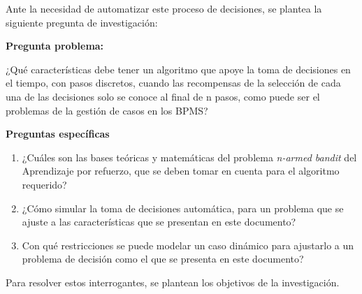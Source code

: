Ante la necesidad de automatizar este proceso de decisiones, se plantea la siguiente pregunta de investigación:

\textbf{Pregunta problema:}

¿Qué características debe tener un algoritmo que apoye la toma de decisiones en el tiempo, con pasos discretos, cuando las recompensas de la selección de cada una de las decisiones solo se conoce al final de n pasos, como puede ser el problemas de la gestión de casos en los BPMS?

\textbf{Preguntas específicas}

\begin{enumerate}

\item ¿Cuáles son las bases teóricas y matemáticas del problema \textit{n-armed bandit} del Aprendizaje por refuerzo, que se deben tomar en cuenta para el algoritmo requerido?
\item ¿Cómo simular la toma de decisiones automática, para un problema que se ajuste a las características que se presentan en este documento?
\item Con qué restricciones se puede modelar un caso dinámico para ajustarlo a un problema de decisión como el que se presenta en este documento?
\end{enumerate}

Para resolver estos interrogantes, se plantean los objetivos de la investigación.





